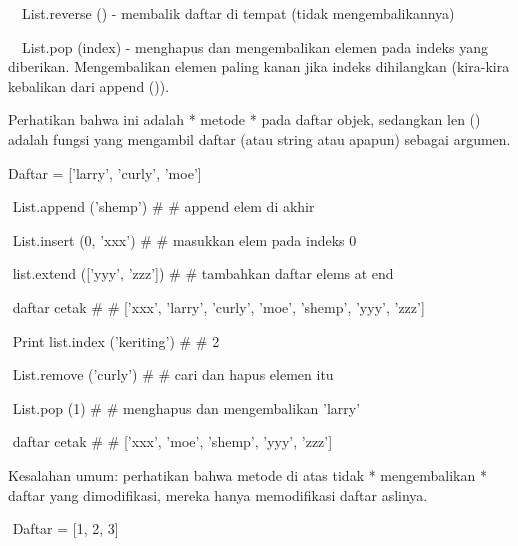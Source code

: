 \documentclass[a4paper,12pt]{report}
\begin{document}
\noindent 
{\fontsize{14pt}{14pt}\selectfont  $  $ $  $ $  $ $  $List.reverse () - membalik daftar di tempat (tidak mengembalikannya) \\} \par
\noindent 
{\fontsize{14pt}{14pt}\selectfont  $  $ $  $ $  $ $  $List.pop (index) - menghapus dan mengembalikan elemen pada indeks yang diberikan. Mengembalikan elemen paling kanan jika indeks dihilangkan (kira-kira kebalikan dari append ()). \\} \par
\vspace{14pt}
\noindent 
{\fontsize{14pt}{14pt}\selectfont Perhatikan bahwa ini adalah * metode * pada daftar objek, sedangkan len () adalah fungsi yang mengambil daftar (atau string atau apapun) sebagai argumen. \\} \par
\vspace{14pt}
\vspace{14pt}
\noindent 
Daftar = ['larry', 'curly', 'moe'] \par
\noindent 
 $  $ $  $List.append ('shemp')  $  \#  $ $  \#  $ append elem di akhir \par
\noindent 
 $  $ $  $List.insert (0, 'xxx')  $  \#  $ $  \#  $ masukkan elem pada indeks 0 \par
\noindent 
 $  $ $  $list.extend (['yyy', 'zzz'])  $  \#  $ $  \#  $ tambahkan daftar elems at end \par
\noindent 
 $  $ $  $daftar cetak  $  \#  $ $  \#  $ ['xxx', 'larry', 'curly', 'moe', 'shemp', 'yyy', 'zzz'] \par
\noindent 
 $  $ $  $Print list.index ('keriting')  $  \#  $ $  \#  $ 2 \par
\vspace{12pt}
\noindent 
 $  $ $  $List.remove ('curly')  $  \#  $ $  \#  $ cari dan hapus elemen itu \par
\noindent 
 $  $ $  $List.pop (1)  $  \#  $ $  \#  $ menghapus dan mengembalikan 'larry' \par
\noindent 
 $  $ $  $daftar cetak  $  \#  $ $  \#  $ ['xxx', 'moe', 'shemp', 'yyy', 'zzz'] \par
\vspace{12pt}
\noindent 
Kesalahan umum: perhatikan bahwa metode di atas tidak * mengembalikan * daftar yang dimodifikasi, mereka hanya memodifikasi daftar aslinya. \par
\vspace{12pt}
\noindent 
 $  $ $  $Daftar = [1, 2, 3] \par
\end{document}
